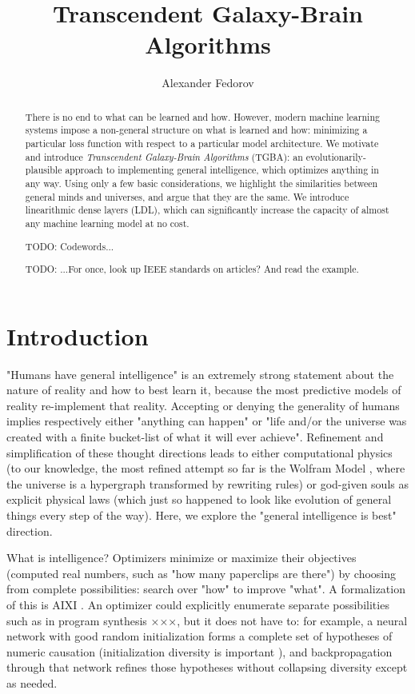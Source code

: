 \documentclass{article}
\begin{document}
\title{Transcendent Galaxy-Brain Algorithms}
\author{Alexander Fedorov}

\maketitle

\begin{abstract}

There is no end to what can be learned and how. However, modern machine learning systems impose a non-general structure on what is learned and how: minimizing a particular loss function with respect to a particular model architecture. We motivate and introduce \textit{Transcendent Galaxy-Brain Algorithms} (TGBA): an evolutionarily-plausible approach to implementing general intelligence, which optimizes anything in any way. Using only a few basic considerations, we highlight the similarities between general minds and universes, and argue that they are the same. We introduce linearithmic dense layers (LDL), which can significantly increase the capacity of almost any machine learning model at no cost.

    TODO: Codewords...

    TODO: ...For once, look up IEEE standards on articles? And read the example.

\end{abstract}

\section{Introduction}

"Humans have general intelligence" is an extremely strong statement about the nature of reality and how to best learn it, because the most predictive models of reality re-implement that reality. Accepting or denying the generality of humans implies respectively either "anything can happen" or "life and/or the universe was created with a finite bucket-list of what it will ever achieve". Refinement and simplification of these thought directions leads to either computational physics (to our knowledge, the most refined attempt so far is the Wolfram Model \cite{Wolfram_2020}, where the universe is a hypergraph transformed by rewriting rules) or god-given souls as explicit physical laws (which just so happened to look like evolution of general things every step of the way). Here, we explore the "general intelligence is best" direction.

What is intelligence? Optimizers minimize or maximize their objectives (computed real numbers, such as "how many paperclips are there") by choosing from complete possibilities: search over "how" to improve "what". A formalization of this is AIXI \cite{DBLP:journals/corr/cs-AI-0004001}. An optimizer could explicitly enumerate separate possibilities such as in program synthesis ×××, but it does not have to: for example, a neural network with good random initialization forms a complete set of hypotheses of numeric causation (initialization diversity is important \cite{mellor2021neural}), and backpropagation through that network refines those hypotheses without collapsing diversity except as needed.
\end{document}
